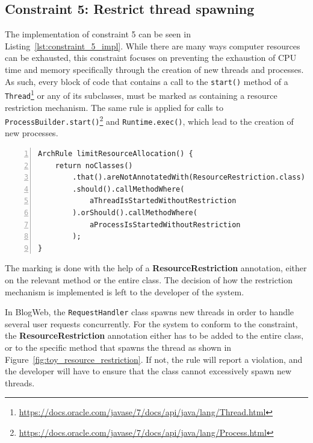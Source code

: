 \subsection{Constraint 5: Restrict thread spawning}
The implementation of constraint 5 can be seen in Listing~\ref{lst:constraint_5_impl}.
While there are many ways computer resources can be exhausted, this constraint focuses on preventing the exhaustion of CPU time and memory specifically through the creation of new threads and processes. As such, every block of code that contains a call to the \texttt{start()} method of a \texttt{Thread}\footnote{\url{https://docs.oracle.com/javase/7/docs/api/java/lang/Thread.html}} or any of its subclasses, must be marked as containing a resource restriction mechanism. The same rule is applied for calls to \texttt{ProcessBuilder.start()}\footnote{\url{https://docs.oracle.com/javase/7/docs/api/java/lang/Process.html}\label{fnt:java_process}} and \texttt{Runtime.exec()}, which lead to the creation of new processes.

\begin{minipage}{\linewidth}
\begin{lstlisting}[caption={Rule definition for constraint 5.}, captionpos=b, label=lst:constraint_5_impl, numbers=left]
ArchRule limitResourceAllocation() {
    return noClasses()
        .that().areNotAnnotatedWith(ResourceRestriction.class)
        .should().callMethodWhere(
            aThreadIsStartedWithoutRestriction
        ).orShould().callMethodWhere(
            aProcessIsStartedWithoutRestriction
        );
}
\end{lstlisting}
\end{minipage}

The marking is done with the help of a \textbf{ResourceRestriction} annotation, either on the relevant method or the entire class. The decision of how the restriction mechanism is implemented is left to the developer of the system.

In BlogWeb, the \texttt{RequestHandler} class spawns new threads in order to handle several user requests concurrently. For the system to conform to the constraint, the \textbf{ResourceRestriction} annotation either has to be added to the entire class, or to the specific method that spawns the thread as shown in Figure~\ref{fig:toy_resource_restriction}. If not, the rule will report a violation, and the developer will have to ensure that the class cannot excessively spawn new threads.

